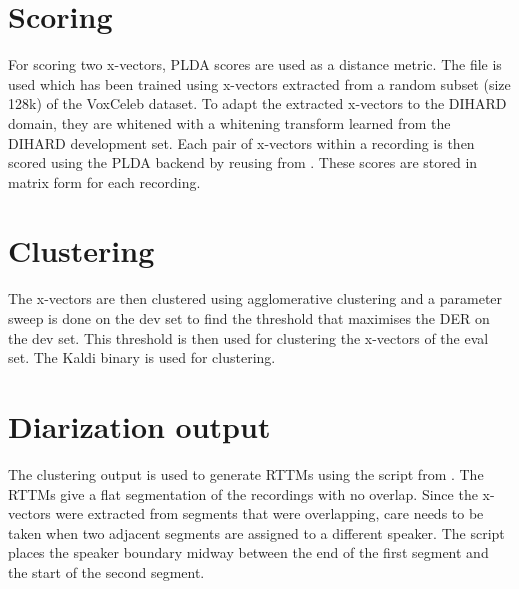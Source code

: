 \section{Scoring}
For scoring two x-vectors, PLDA scores are used as a distance metric. The  file is used which has been trained using x-vectors extracted from a random subset (size 128k) of the VoxCeleb dataset. To adapt the extracted x-vectors to the DIHARD domain, they are whitened with a whitening transform learned from the DIHARD development set. Each pair of x-vectors within a recording is then scored using the PLDA backend by reusing  from . These scores are stored in matrix form for each recording.

\section{Clustering}
The x-vectors are then clustered using agglomerative clustering and a parameter sweep is done on the dev set to find the threshold that maximises the DER on the dev set. This threshold is then used for clustering the x-vectors of the eval set. The  Kaldi binary is used for clustering.

\section{Diarization output}
The clustering output is used to generate RTTMs using the script  from . The RTTMs give a flat segmentation of the recordings with no overlap. Since the x-vectors were extracted from segments that were overlapping, care needs to be taken when two adjacent segments are assigned to a different speaker. The script places the speaker boundary midway between the end of the first segment and the start of the second segment.

